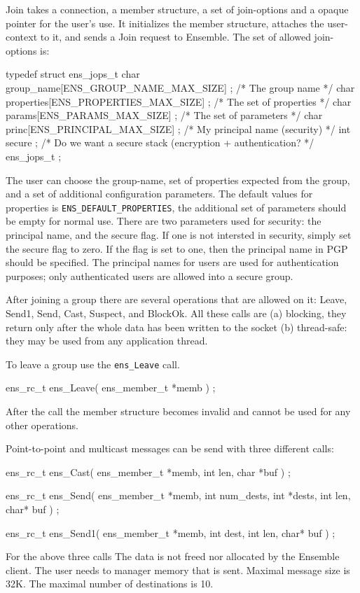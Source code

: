 Join takes a connection, a member structure, a set of join-options and
a opaque pointer for the user's use. It initializes the member
structure, attaches the user-context to it, and sends a Join request
to Ensemble. The set of allowed join-options is: 

\begin{codebox}
typedef struct ens_jops_t {
    char group_name[ENS_GROUP_NAME_MAX_SIZE] ; /* The group name */
    char properties[ENS_PROPERTIES_MAX_SIZE] ; /* The set of properties */
    char params[ENS_PARAMS_MAX_SIZE] ;         /* The set of parameters */
    char princ[ENS_PRINCIPAL_MAX_SIZE] ;       /* My principal name (security) */
    int secure ;                               /* Do we want a secure stack (encryption + authentication? */
} ens_jops_t ;
\end{codebox}

The user can choose the group-name, set of properties expected from
the group, and a set of additional configuration parameters. The
default values for properties is {\tt ENS\_DEFAULT\_PROPERTIES}, the
additional set of parameters should be empty for normal use. There are
two parameters used for security: the principal name, and the secure
flag. If one is not intersted in security, simply set the secure flag
to zero. If the flag is set to one, then the principal name in PGP 
should be specified. The principal names for users are used for
authentication purposes; only authenticated users are allowed into a
secure group. 

After joining a group there are several operations that are allowed on
it: Leave, Send1, Send, Cast, Suspect, and BlockOk. All these calls
are (a) blocking, they return only after the whole data has been
written to the socket (b) thread-safe: they may be used from any
application thread.

To leave a group use the {\tt ens\_Leave} call. 
\begin{codebox}
ens_rc_t ens_Leave(
    ens_member_t *memb
    ) ;
\end{codebox}
After the call the member structure becomes invalid and cannot be used
for any other operations. 

Point-to-point and multicast messages can be send with three different calls: 
\begin{codebox}
ens_rc_t ens_Cast(
    ens_member_t *memb,
    int len, 
    char *buf
    ) ;

ens_rc_t ens_Send(
    ens_member_t *memb,
    int num_dests,
    int *dests,
    int len, 
    char* buf
    ) ;

ens_rc_t ens_Send1(
    ens_member_t *memb,
    int dest,
    int len, 
    char* buf
    ) ;
\end{codebox}
For the above three calls The data is not freed nor allocated by the
Ensemble client. The user needs to manager memory that is
sent. Maximal message size is 32K. The maximal number of destinations
is 10.

